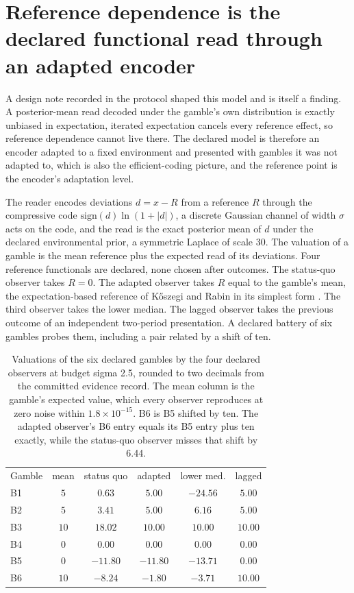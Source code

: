 \documentclass[aps,pre,reprint,nofootinbib]{revtex4-2}
\begin{document}
\section{Reference dependence is the declared functional read
through an adapted encoder}
\label{sec:gd4}

A design note recorded in the protocol shaped this model and is
itself a finding.  A posterior-mean read decoded under the gamble's
own distribution is exactly unbiased in expectation, iterated
expectation cancels every reference effect, so reference dependence
cannot live there.  The declared model is therefore an encoder
adapted to a fixed environment and presented with gambles it was
not adapted to, which is also the efficient-coding picture, and the
reference point
is the encoder's adaptation level.

The reader encodes deviations $d = x - R$ from a reference $R$
through the compressive code $\mathrm{sign}(d)\ln(1+\lvert d\rvert)$,
a discrete Gaussian channel of width $\sigma$ acts on the code, and
the read is the exact posterior mean of $d$ under the declared
environmental prior, a symmetric Laplace of scale $30$.  The
valuation of a gamble is the mean reference plus the expected read of
its deviations.  Four reference functionals are declared, none chosen
after outcomes.  The status-quo observer takes $R = 0$.  The adapted
observer takes $R$ equal to the gamble's mean, the expectation-based
reference of K\H{o}szegi and Rabin in its simplest form
\cite{KoszegiRabin2006}.  The third observer takes the lower median.
The lagged observer takes the previous outcome of an independent
two-period presentation.  A declared battery of six gambles probes
them, including a pair related by a shift of ten.

\begin{table}[t]
\caption{Valuations of the six declared gambles by the four declared
observers at budget sigma 2.5, rounded to two decimals from the
committed evidence record.  The mean column is the gamble's expected
value, which every observer reproduces at zero noise within
$1.8\times10^{-15}$.  B6 is
B5 shifted by ten.  The adapted observer's B6 entry equals its B5
entry plus ten exactly, while the status-quo observer misses that
shift by 6.44.}
\label{tab:gd4}
\begin{ruledtabular}
\begin{tabular}{lccccc}
Gamble & mean & status quo & adapted & lower med. & lagged \\
\colrule
B1 & $5$  & $0.63$   & $5.00$   & $-24.56$ & $5.00$  \\
B2 & $5$  & $3.41$   & $5.00$   & $6.16$   & $5.00$  \\
B3 & $10$ & $18.02$  & $10.00$  & $10.00$  & $10.00$ \\
B4 & $0$  & $0.00$   & $0.00$   & $0.00$   & $0.00$  \\
B5 & $0$  & $-11.80$ & $-11.80$ & $-13.71$ & $0.00$  \\
B6 & $10$ & $-8.24$  & $-1.80$  & $-3.71$  & $10.00$ \\
\end{tabular}
\end{ruledtabular}
\end{table}
\end{document}

